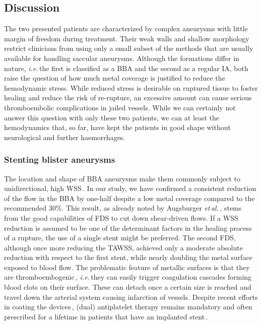 \subsection{Discussion}
The two presented patients are characterized by complex aneurysms with little margin of freedom during treatment. Their weak walls and shallow morphology restrict clinicians from using only a small subset of the methods that are usually available for handling saccular aneurysms. Although the formations differ in nature, \textit{i.e.}\,the first is classified as a BBA and the second as a regular IA, both raise the question of how much metal coverage is justified to reduce the hemodynamic stress. While reduced stress is desirable on ruptured tissue to foster healing and reduce the risk of re-rupture, an excessive amount can cause serious thromboembolic complications in jailed vessels. While we can certainly not answer this question with only these two patients, we can at least the hemodynamics that, so far, have kept the patients in good shape without neurological and further haemorrhages.


\subsubsection*{Stenting blister aneurysms}
The location and shape of BBA aneurysms make them commonly subject to unidirectional, high WSS\,\cite{Peschillo2016}. In our study, we have confirmed a consistent reduction of the flow in the BBA by one-half despite a low metal coverage compared to the recommended 30\%. This result, as already noted by Augsburger \textit{et\,al.}\,\cite{Augsburger2011}, stems from the good capabilities of FDS to cut down shear-driven flows. If a WSS reduction is assumed to be one of the determinant factors in the healing process of a rupture, the use of a single stent might be preferred. The second FDS, although once more reducing the TAWSS, achieved only a moderate absolute reduction with respect to the first stent, while nearly doubling the metal surface exposed to blood flow. The problematic feature of metallic surfaces is that they are thromboembogenic\,\cite{GEGENSCHATZSCHMID2022}, \textit{i.e.}\,they can easily trigger coagulation cascades forming blood clots on their surface. These can detach once a certain size is reached and travel down the arterial system causing infarction of vessels. Despite recent efforts in coating the devices\,\cite{Girdhar2018}, (dual) antiplatelet therapy remains mandatory and often prescribed for a lifetime in patients that have an implanted stent\,\cite{Dandapat2021}.

